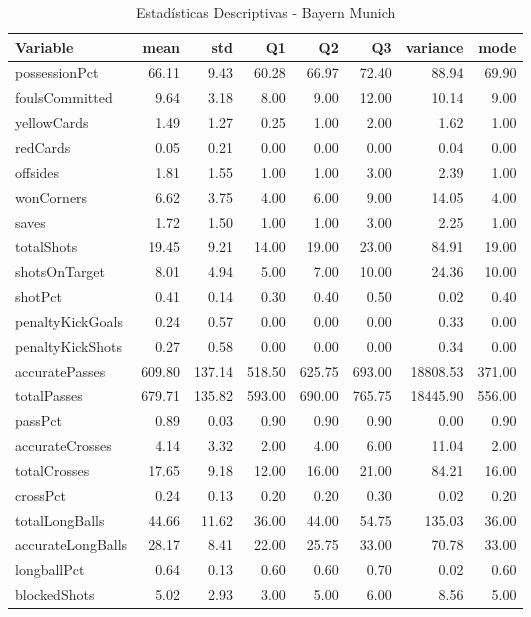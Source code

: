 \begin{table}[H]
\centering
\caption{Estadísticas Descriptivas - Bayern Munich}
\label{tab:ger_bayern_munich}
\small
\begin{tabular}{lrrrrrrr}
\hline
Variable & mean & std & Q1 & Q2 & Q3 & variance & mode \\
\hline
possessionPct & 66.11 & 9.43 & 60.28 & 66.97 & 72.40 & 88.94 & 69.90 \\
foulsCommitted & 9.64 & 3.18 & 8.00 & 9.00 & 12.00 & 10.14 & 9.00 \\
yellowCards & 1.49 & 1.27 & 0.25 & 1.00 & 2.00 & 1.62 & 1.00 \\
redCards & 0.05 & 0.21 & 0.00 & 0.00 & 0.00 & 0.04 & 0.00 \\
offsides & 1.81 & 1.55 & 1.00 & 1.00 & 3.00 & 2.39 & 1.00 \\
wonCorners & 6.62 & 3.75 & 4.00 & 6.00 & 9.00 & 14.05 & 4.00 \\
saves & 1.72 & 1.50 & 1.00 & 1.00 & 3.00 & 2.25 & 1.00 \\
totalShots & 19.45 & 9.21 & 14.00 & 19.00 & 23.00 & 84.91 & 19.00 \\
shotsOnTarget & 8.01 & 4.94 & 5.00 & 7.00 & 10.00 & 24.36 & 10.00 \\
shotPct & 0.41 & 0.14 & 0.30 & 0.40 & 0.50 & 0.02 & 0.40 \\
penaltyKickGoals & 0.24 & 0.57 & 0.00 & 0.00 & 0.00 & 0.33 & 0.00 \\
penaltyKickShots & 0.27 & 0.58 & 0.00 & 0.00 & 0.00 & 0.34 & 0.00 \\
accuratePasses & 609.80 & 137.14 & 518.50 & 625.75 & 693.00 & 18808.53 & 371.00 \\
totalPasses & 679.71 & 135.82 & 593.00 & 690.00 & 765.75 & 18445.90 & 556.00 \\
passPct & 0.89 & 0.03 & 0.90 & 0.90 & 0.90 & 0.00 & 0.90 \\
accurateCrosses & 4.14 & 3.32 & 2.00 & 4.00 & 6.00 & 11.04 & 2.00 \\
totalCrosses & 17.65 & 9.18 & 12.00 & 16.00 & 21.00 & 84.21 & 16.00 \\
crossPct & 0.24 & 0.13 & 0.20 & 0.20 & 0.30 & 0.02 & 0.20 \\
totalLongBalls & 44.66 & 11.62 & 36.00 & 44.00 & 54.75 & 135.03 & 36.00 \\
accurateLongBalls & 28.17 & 8.41 & 22.00 & 25.75 & 33.00 & 70.78 & 33.00 \\
longballPct & 0.64 & 0.13 & 0.60 & 0.60 & 0.70 & 0.02 & 0.60 \\
blockedShots & 5.02 & 2.93 & 3.00 & 5.00 & 6.00 & 8.56 & 5.00 \\

\end{tabular}
\end{table}
